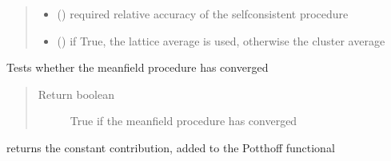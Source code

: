 \documentclass[letterpaper,10pt,english]{sphinxmanual}
\begin{document}
\begin{fulllineitems}
\begin{fulllineitems}
\begin{quote}
\begin{description}
\begin{itemize}
\item {} 
\sphinxAtStartPar
{} () \textendash{} required relative accuracy of the self\sphinxhyphen{}consistent procedure

\item {} 
\sphinxAtStartPar
{} () \textendash{} if True, the lattice average is used, otherwise the cluster average

\end{itemize}

\end{description}\end{quote}

\end{fulllineitems}


\begin{fulllineitems}
\label{\detokenize{utilities:pyqcm.hartree.hartree.converged}}
\sphinxAtStartPar
Tests whether the mean\sphinxhyphen{}field procedure has converged
\begin{quote}\begin{description}
\item[{Return boolean}] \leavevmode
\sphinxAtStartPar
True if the mean\sphinxhyphen{}field procedure has converged

\end{description}\end{quote}

\end{fulllineitems}


\begin{fulllineitems}
\label{\detokenize{utilities:pyqcm.hartree.hartree.omega}}
\sphinxAtStartPar
returns the constant contribution, added to the Potthoff functional

\end{fulllineitems}



\end{fulllineitems}
\end{document}
